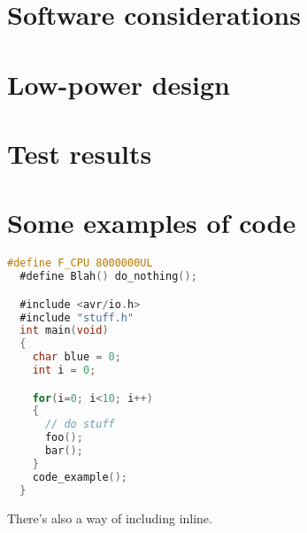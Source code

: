 \section{Software considerations}

\section{Low-power design}

\section{Test results}

\section{Some examples of code}
\begin{lstlisting}[language=C]
  #define F_CPU 8000000UL
  #define Blah() do_nothing();

  #include <avr/io.h>
  #include "stuff.h"
  int main(void)
  {
    char blue = 0;
    int i = 0;

    for(i=0; i<10; i++)
    {
      // do stuff
      foo();
      bar();
    }
    code_example();
  }
\end{lstlisting}

There's also a way of including  inline.


